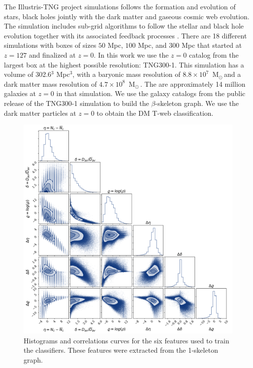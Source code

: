 \documentclass[usenatbib]{mnras}
\newcommand{\Msun}{\,{\rm M}$_{\odot}$\,}
\begin{document}
The Illustris-TNG project simulations follows the formation and evolution of stars, black holes jointly with the dark matter and gaseous cosmic web evolution. 
The simulation includes sub-grid algorithms to follow the stellar and black hole evolution together with its associated feedback processes \citep{Nelson2019,Springel2018}.
There are 18 different simulations with boxes of sizes $50$ Mpc, $100$ Mpc, and $300$ Mpc that started at $z=127$ and finalized at $z=0$.    
In this work we use the $z=0$ catalog from the largest box at the highest possible resolution: TNG300-1.
This simulation has a volume of 302.6$^3$ Mpc$^3$, with a baryonic mass resolution of $8.8\times 10^{7}$ \Msun and a dark matter mass resolution of $4.7\times  10^{8}$ \Msun \citep{Nelson2019}.
The are approximately 14 million galaxies at $z=0$ in that simulation.
We use the galaxy catalogs from the public release of the TNG300-1 simulation \citep{Pillepich2018a} to build the $\beta$-skeleton graph.
We use the dark matter particles at $z=0$ to obtain the DM T-web classification.
 

\begin{figure}
        \includegraphics[scale=0.46]{Figs/p_all_features_correlations.pdf}
    \caption{Histograms and correlations curves for the six features
      used to train the classifiers. These features were extracted from the 1-skeleton graph.}
    \label{fig:features}
\end{figure}
\end{document}
